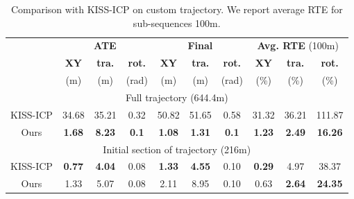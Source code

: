 \begin{table}[h]
    \centering
    {\small
        \begin{tabular}{c|ccc|ccc|ccc}
            \hline
                     & \multicolumn{3}{c|}{\textbf{ATE}} & \multicolumn{3}{c|}{\textbf{Final}} & \multicolumn{3}{c}{\textbf{Avg. RTE} (100m)}                                                                                                  \\
                     & \textbf{XY}                       & \textbf{tra.}                       & \textbf{rot.}                                & \textbf{XY}   & \textbf{tra.} & \textbf{rot.} & \textbf{XY}   & \textbf{tra.} & \textbf{rot.}  \\
                     & (m)                               & (m)                                 & (rad)                                        & (m)           & (m)           & (rad)         & (\%)          & (\%)          & (\%)           \\
            \hline
            \multicolumn{10}{c}{Full trajectory (644.4m)}                                                                                                                                                                                      \\
            \hline
            KISS-ICP & 34.68                             & 35.21                               & 0.32                                         & 50.82         & 51.65         & 0.58          & 31.32         & 36.21         & 111.87         \\
            Ours     & \textbf{1.68}                     & \textbf{8.23}                       & \textbf{0.1}                                 & \textbf{1.08} & \textbf{1.31} & \textbf{0.1}  & \textbf{1.23} & \textbf{2.49} & \textbf{16.26} \\
            \hline
            \multicolumn{10}{c}{Initial section of trajectory (216m)}                                                                                                                                                                          \\
            \hline
            KISS-ICP & \textbf{0.77}                     & \textbf{4.04}                       & 0.08                                         & \textbf{1.33} & \textbf{4.55} & 0.10          & \textbf{0.29} & 4.97          & 38.37          \\
            Ours     & 1.33                              & 5.07                                & 0.08                                         & 2.11          & 8.95          & 0.10          & 0.63          & \textbf{2.64} & \textbf{24.35} \\
            \hline
        \end{tabular}
    }
    \caption{Comparison with KISS-ICP \cite{vizzo2023ral} on custom trajectory. We report average RTE for sub-sequences 100m. }
    \label{tab:custom-traj-results}
\end{table}

